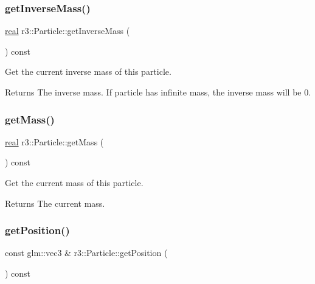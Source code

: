 \subsubsection{\texorpdfstring{get\+Inverse\+Mass()}{getInverseMass()}}
{\footnotesize\ttfamily \mbox{\hyperlink{namespacer3_ab2016b3e3f743fb735afce242f0dc1eb}{real}} r3\+::\+Particle\+::get\+Inverse\+Mass (\begin{DoxyParamCaption}{ }\end{DoxyParamCaption}) const}



Get the current inverse mass of this particle. 

\begin{DoxyReturn}{Returns}
The inverse mass. If particle has infinite mass, the inverse mass will be 0. 
\end{DoxyReturn}
\mbox{\label{classr3_1_1_particle_ade86b59933d1acc8d33f79a8735d8f3d}} 
\subsubsection{\texorpdfstring{get\+Mass()}{getMass()}}
{\footnotesize\ttfamily \mbox{\hyperlink{namespacer3_ab2016b3e3f743fb735afce242f0dc1eb}{real}} r3\+::\+Particle\+::get\+Mass (\begin{DoxyParamCaption}{ }\end{DoxyParamCaption}) const}



Get the current mass of this particle. 

\begin{DoxyReturn}{Returns}
The current mass. 
\end{DoxyReturn}
\mbox{\label{classr3_1_1_particle_a6f61c64625f2d9bf7fe1145d74790a92}} 
\subsubsection{\texorpdfstring{get\+Position()}{getPosition()}}
{\footnotesize\ttfamily const glm\+::vec3 \& r3\+::\+Particle\+::get\+Position (\begin{DoxyParamCaption}{ }\end{DoxyParamCaption}) const}



